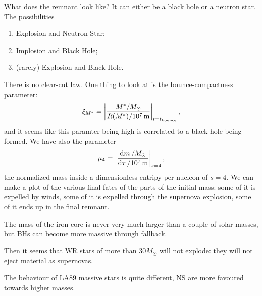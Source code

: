 \documentclass[main.tex]{subfiles}
\begin{document}
What does the remnant look like? It can either be a black hole or a neutron star. The possibilities 
\begin{enumerate}
    \item Explosion and Neutron Star;
    \item Implosion and Black Hole;
    \item (rarely) Explosion and Black Hole.
\end{enumerate}

There is no clear-cut law. One thing to look at is the bounce-compactness parameter: 
%
\begin{align}
  \xi_{M^*} = \abs{\frac{M^{*} / M_{\odot}}{R(M^{*}) / \SI{e7}{m}}}_{t = t _{\text{bounce}}}
\,,
\end{align}
%
and it seems like this paramter being high is correlated to a black hole being formed. 
We have also the parameter 
%
\begin{align}
  \mu_{4}  = \abs{\frac{ \dd{m} / M_{\odot}}{ \dd{\tau } / \SI{e7}{m}}}_{s=4}
\,,
\end{align}
%
the normalized mass inside a dimensionless entripy per nucleon of \(s=4\). 
We can make a plot of the various final fates of the parts of the initial mass: some of it is expelled by winds, some of it is expelled through the supernova explosion, some of it ends up in the final remnant.

The mass of the iron core is never very much larger than a couple of solar masses, but BHs can become more massive through fallback. 

Then it seems that WR stars of more than \(30 M_{\odot}\) will not explode: they will not eject material as supernovas. 


The behaviour of LA89 massive stars is quite different, NS are more favoured towards higher masses. 
\end{document}
